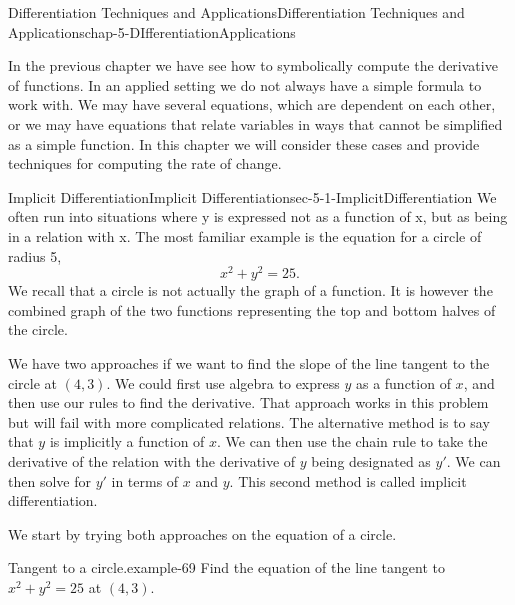 \documentclass[oneside,10pt,]{book}
\numberwithin{equation}{section}
\begin{document}
\begin{chapterptx}{Differentiation Techniques and Applications}{}{Differentiation Techniques and Applications}{}{}{chap-5-DIfferentiationApplications}
\begin{introduction}{}%
\hypertarget{p-1859}{}%
In the previous chapter we have see how to symbolically compute the derivative of functions. In an applied setting we do not always have a simple formula to work with. We may have several equations, which are dependent on each other, or we may have equations that relate variables in ways that cannot be simplified as a simple function. In this chapter we will consider these cases and provide techniques for computing the rate of change.%
\end{introduction}%
%
%
\typeout{************************************************}
\typeout{************************************************}
%
\begin{sectionptx}{Implicit Differentiation}{}{Implicit Differentiation}{}{}{sec-5-1-ImplicitDifferentiation}
\hypertarget{p-1860}{}%
We often run into situations where y is expressed not as a function of x, but as being in a relation with x.  The most familiar example is the equation for a circle of radius 5,%
%
\begin{equation*}
x^2+y^2=25.
\end{equation*}
\hypertarget{p-1861}{}%
We recall that a circle is not actually the graph of a function.  It is however the combined graph of the two functions representing the top and bottom halves of the circle.%
\par
\hypertarget{p-1862}{}%
We have two approaches if we want to find the slope of the line tangent to the circle at \((4,3)\).  We could first use algebra to express \(y\) as a function of \(x\), and then use our rules to find the derivative.  That approach works in this problem but will fail with more complicated relations.  The alternative method is to say that \(y\) is implicitly a function of \(x\).  We can then use the chain rule to take the derivative of the relation with the derivative of \(y\) being designated as \(y'\).  We can then solve for \(y'\) in terms of \(x\) and \(y\).  This second method is called implicit differentiation.%
\par
\hypertarget{p-1863}{}%
We start by trying both approaches on the equation of a circle.%
\begin{example}{Tangent to a circle.}{example-69}%
\hypertarget{p-1864}{}%
Find the equation of the line tangent to \(x^2+y^2=25\) at \((4,3)\).%

\end{example}
\end{sectionptx}
\end{chapterptx}
\end{document}
